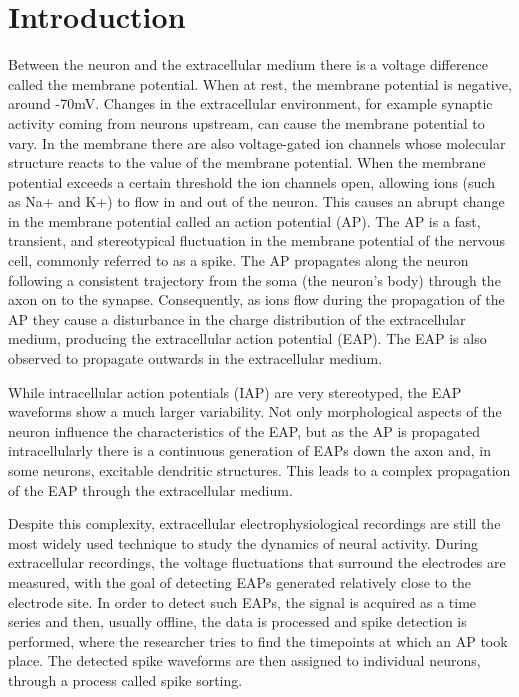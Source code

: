 \section{Introduction}
\label{sec:introduction}

Between the neuron and the extracellular medium there is a voltage difference called the membrane potential. When at rest, the membrane potential is negative, around -70mV. Changes in the extracellular environment, for example synaptic activity coming from neurons upstream, can cause the membrane potential to vary. In the membrane there are also voltage-gated ion channels whose molecular structure reacts to the value of the membrane potential. When the membrane potential exceeds a certain threshold the ion channels open, allowing ions (such as Na+ and K+) to flow in and out of the neuron. This causes an abrupt change in the membrane potential called an action potential (AP). The AP is a fast, transient, and stereotypical fluctuation in the membrane potential of the nervous cell, commonly referred to as a spike. The AP propagates along the neuron following a consistent trajectory from the soma (the neuron's body) through the axon on to the synapse. 
Consequently, as ions flow during the propagation of the AP they cause a disturbance in the charge distribution of the extracellular medium, producing the extracellular action potential (EAP). The EAP is also observed to propagate outwards in the extracellular medium. \cite{kandel}

While intracellular action potentials (IAP) are very stereotyped, the EAP waveforms show a much larger variability. Not only morphological aspects of the neuron influence the characteristics of the EAP, but as the AP is propagated intracellularly there is a continuous generation of EAPs down the axon and, in some neurons, excitable dendritic structures. This leads to a complex propagation of the EAP through the extracellular medium. \cite{gold2007biophysics} \cite{pettersen2008amplitude}
 
Despite this complexity, extracellular electrophysiological recordings are still the most widely used technique to study the dynamics of neural activity. During extracellular recordings, the voltage fluctuations that surround the electrodes are measured, with the goal of detecting EAPs generated relatively close to the electrode site. In order to detect such EAPs, the signal is acquired as a time series and then, usually offline, the data is processed and spike detection is performed, where the researcher tries to find the timepoints at which an AP took place. The detected spike waveforms are then assigned to individual neurons, through a process called spike sorting.

